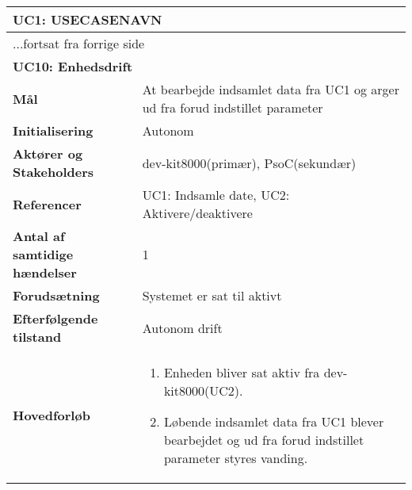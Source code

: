 \begin{center} \centering
	\begin{longtable}{|p{6cm}|p{8cm}|}  %
	\hline
		\multicolumn{2}{|l|}{\textbf{UC1: USECASENAVN}} \\\hline %
		\endfirsthead
		
		\multicolumn{2}{l}{...fortsat fra forrige side} \\ \hline %
		\multicolumn{2}{|l|}{\textbf{UC10: Enhedsdrift}} \\\hline %
		\endhead	
		
		\textbf{Mål}								&At bearbejde indsamlet data fra UC1 og arger ud fra forud indstillet parameter 			\\\hline
		\textbf{Initialisering}					&Autonom			\\\hline
		\textbf{Aktører og Stakeholders}			&dev-kit8000(primær), PsoC(sekundær)			\\\hline
		\textbf{Referencer}						&UC1: Indsamle date, UC2: Aktivere/deaktivere			\\\hline
		\textbf{Antal af samtidige hændelser}	&1		\\\hline
		\textbf{Forudsætning}					&Systemet er sat til aktivt			\\\hline
		\textbf{Efterfølgende tilstand}			&Autonom drift		\\\hline
		\textbf{Hovedforløb}					
			&\begin{enumerate}
	
				\item Enheden bliver sat aktiv fra dev-kit8000(UC2).
				
				\item Løbende indsamlet data fra UC1 blever bearbejdet og ud fra forud indstillet parameter styres vanding.
				
	
			\end{enumerate}\\\hline
	\end{longtable}
	\label{UC10} 
\end{center}

